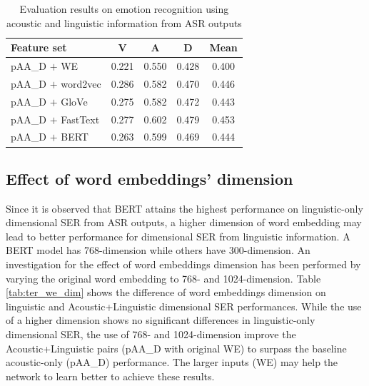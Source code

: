 \begin{table}[htbp]
  \caption{Evaluation results on emotion recognition using acoustic and linguistic information from ASR outputs}
  \begin{center}
  \begin{tabular}{l | c c c c}
  \hline
Feature set & V & A & D & Mean \\
\hline \hline
pAA\_D $+$ WE       & 0.221 & 0.550 & 0.428 & 0.400 \\
pAA\_D $+$ word2vec & 0.286 & 0.582 & 0.470 & 0.446 \\
pAA\_D $+$ GloVe    & 0.275 & 0.582 & 0.472 & 0.443 \\
pAA\_D $+$ FastText & 0.277 & 0.602 & 0.479 & 0.453 \\
pAA\_D $+$ BERT     & 0.263 & 0.599 & 0.469 & 0.444 \\
  \hline
  \end{tabular}
  \label{tab:serter_asr}
\end{center}
\end{table}


\subsection{Effect of word embeddings' dimension}
Since it is observed that BERT attains the highest performance on
linguistic-only dimensional SER from ASR outputs, a higher dimension of word
embedding may lead to better performance for dimensional SER from linguistic
information. A BERT model has 768-dimension while others have 300-dimension. An
investigation for the effect of word embeddings dimension has been performed by
varying the original word embedding to 768- and 1024-dimension. Table
\ref{tab:ter_we_dim} shows the difference of word embeddings dimension on
linguistic and Acoustic+Linguistic dimensional SER performances. While the use
of a higher dimension shows no significant differences in linguistic-only
dimensional SER, the use of 768- and 1024-dimension improve the
Acoustic+Linguistic pairs (pAA\_D with original WE) to surpass the baseline
acoustic-only (pAA\_D) performance. The larger inputs (WE) may help the network
to learn better to achieve these results.

